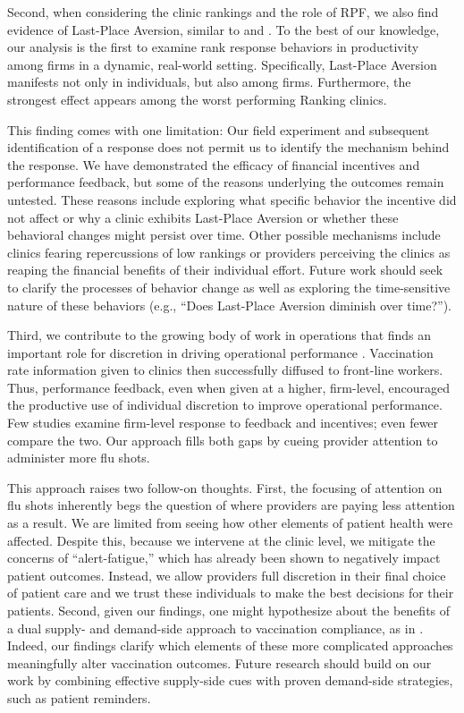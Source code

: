  Second, when considering the clinic rankings and the role of RPF, we also find evidence of Last-Place Aversion, similar to \cite{Kuziemko2014,Gill2019} and \cite{Buell2021}. To the best of our knowledge, our analysis is the first to examine rank response behaviors in productivity among firms in a dynamic, real-world setting. Specifically, Last-Place Aversion manifests not only in individuals, but also among firms. Furthermore, the strongest effect appears among the worst performing Ranking clinics. 

 This finding comes with one limitation: Our field experiment and subsequent identification of a response does not permit us to identify the mechanism behind the response. We have demonstrated the efficacy of financial incentives and performance feedback, but some of the reasons underlying the outcomes remain untested. These reasons include exploring what specific behavior the incentive did not affect or why a clinic exhibits Last-Place Aversion or whether these behavioral changes might persist over time. Other possible mechanisms include clinics fearing repercussions of low rankings or providers perceiving the clinics as reaping the financial benefits of their individual effort. Future work should seek to clarify the processes of behavior change as well as exploring the time-sensitive nature of these behaviors (e.g., “Does Last-Place Aversion diminish over time?”). 

 Third, we contribute to the growing body of work in operations that finds an important role for discretion in driving operational performance \citep[e.g.,][]{VanDonselaar2010,Campbell2011,Kim2015,Phillips2015,Ibanez2017,Song2018a}. Vaccination rate information given to clinics then successfully diffused to front-line workers. Thus, performance feedback, even when given at a higher, firm-level, encouraged the productive use of individual discretion to improve operational performance. Few studies examine firm-level response to feedback and incentives; even fewer compare the two. Our approach fills both gaps by cueing provider attention to administer more flu shots.

 This approach raises two follow-on thoughts. First, the focusing of attention on flu shots inherently begs the question of where providers are paying less attention as a result. We are limited from seeing how other elements of patient health were affected. Despite this, because we intervene at the clinic level, we mitigate the concerns of “alert-fatigue,” which has already been shown to negatively impact patient outcomes. Instead, we allow providers full discretion in their final choice of patient care and we trust these individuals to make the best decisions for their patients. Second, given our findings, one might hypothesize about the benefits of a dual supply- and demand-side approach to vaccination compliance, as in \cite{Zimmerman2014}. Indeed, our findings clarify which elements of these more complicated approaches meaningfully alter vaccination outcomes. Future research should build on our work by combining effective supply-side cues with proven demand-side strategies, such as patient reminders.

